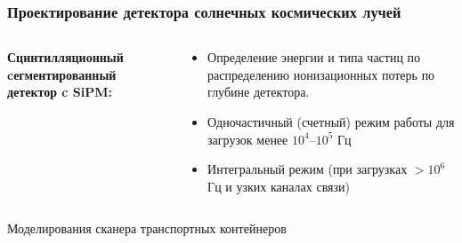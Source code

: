 \begin{frame}
\frametitle{Проектирование детектора солнечных космических лучей}
\begin{columns}
	\begin{column}{0.4\textwidth}
		\textbf{Сцинтилляционный cегментированный детектор c SiPM:}
	\end{column}
	\begin{column}{0.6\textwidth}
		\begin{itemize}
			\item Определение энергии и типа частиц по распределению ионизационных потерь по глубине детектора.
			\item Одночастичный (счетный) режим работы для загрузок менее $10^4 – 10^5$ Гц
			\item Интегральный режим (при загрузках $>10^6$ Гц и узких каналах связи)
		\end{itemize}
	\end{column}
\end{columns} 
\end{frame}



\begin{frame}
\begin{center}
	\Huge
	Моделирования сканера транспортных контейнеров
\end{center}
\end{frame}

